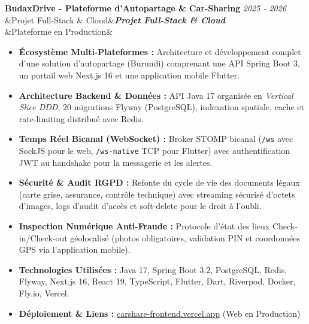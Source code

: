 \documentclass[11pt, a4paper]{article}
\newcommand{\cventry}[4]{%
  \needspace{3\baselineskip}%
  \noindent\textbf{\large #1} \hfill {\small\color{secondary}\textit{#2}}\\[2pt]%
  \ifx&#3&\else\noindent\textbf{\textit{#3}}\\[3pt]\fi
  \ifx&#4&\else\noindent{#4}\fi
  \vspace{6pt}\par
}
\begin{document}
\cventry{BudaxDrive - Plateforme d'Autopartage \& Car-Sharing}{2025 - 2026}{Projet Full-Stack \& Cloud}{Plateforme en Production}
\begin{itemize}
  \item \textbf{Écosystème Multi-Plateformes :} Architecture et développement complet d'une solution d'autopartage (Burundi) comprenant une API Spring Boot 3, un portail web Next.js 16 et une application mobile Flutter.
  \item \textbf{Architecture Backend \& Données :} API Java 17 organisée en \textit{Vertical Slice DDD}, 20 migrations Flyway (PostgreSQL), indexation spatiale, cache et rate-limiting distribué avec Redis.
  \item \textbf{Temps Réel Bicanal (WebSocket) :} Broker STOMP bicanal (\texttt{/ws} avec SockJS pour le web, \texttt{/ws-native} TCP pour Flutter) avec authentification JWT au handshake pour la messagerie et les alertes.
  \item \textbf{Sécurité \& Audit RGPD :} Refonte du cycle de vie des documents légaux (carte grise, assurance, contrôle technique) avec streaming sécurisé d'octets d'images, logs d'audit d'accès et soft-delete pour le droit à l'oubli.
  \item \textbf{Inspection Numérique Anti-Fraude :} Protocole d'état des lieux Check-in/Check-out géolocalisé (photos obligatoires, validation PIN et coordonnées GPS via l'application mobile).
  \item \textbf{Technologies Utilisées :} Java 17, Spring Boot 3.2, PostgreSQL, Redis, Flyway, Next.js 16, React 19, TypeScript, Flutter, Dart, Riverpod, Docker, Fly.io, Vercel.
  \item \textbf{Déploiement \& Liens :} \href{https://carshare-frontend.vercel.app/}{carshare-frontend.vercel.app} (Web en Production)
\end{itemize}

\vspace{4pt}
\end{document}
